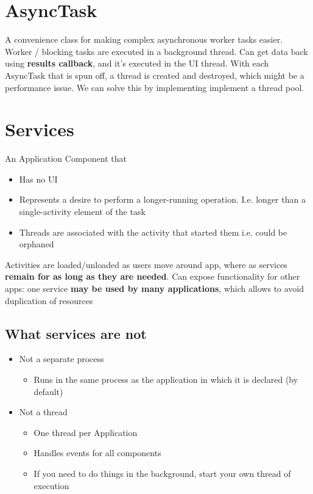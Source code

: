 \documentclass{article}
\begin{document}
\section{AsyncTask}
\begin{flushleft}
A convenience class for making complex asynchronous worker tasks easier. Worker / blocking tasks are executed in a background thread.
Can get data back using \textbf{results callback}, and it's executed in the UI thread. With each AsyncTask that is spun off, a thread is created and destroyed, which might be a performance issue. We can solve this by implementing implement a thread pool.
\end{flushleft}

\section{Services}
\begin{flushleft}
An	Application	Component	that
\begin{itemize}
  \item Has	no	UI
  \item Represents	a	desire	to	perform	a	longer-running	operation. I.e.	longer	than	a	single-activity	element	of	the	task
  \item Threads	are	associated	with	the	activity	that	started	them i.e.	could	be orphaned
\end{itemize}
Activities	are	loaded/unloaded	as	users	move	around	app, where as services	\textbf{remain	for	as	long	as	they	are	needed}.
Can expose	functionality	for	other	apps: one	service	\textbf{may	be	used	by	many	applications}, which allows to avoid	duplication	of	resources
\end{flushleft}


\subsection{What services are not}
\begin{itemize}
  \item Not a separate process
  \begin{itemize}
    \item Runs in the same process as the application in which it is declared (by default) 
  \end{itemize}
  \item Not a thread
  \begin{itemize}
    \item One thread per Application
    \item Handles events for all components
    \item If you need to do things in the background, start your own thread of execution
  \end{itemize}
\end{itemize}
\end{document}
